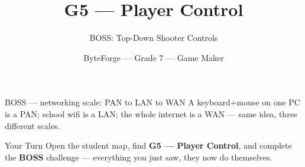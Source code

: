 \documentclass[aspectratio=169]{beamer}
\title{G5 — Player Control}
\subtitle{BOSS: Top-Down Shooter Controls}
\author{ByteForge --- Grade 7 --- Game Maker}
\date{}
\begin{document}
\begin{frame}
    \titlepage
\end{frame}

\begin{frame}{BOSS — networking scale: PAN to LAN to WAN}
    \Large
    A keyboard+mouse on one PC is a PAN; school wifi is a LAN; the whole internet is a WAN — same idea, three different scales.
\end{frame}

\begin{frame}{Your Turn}
    \Large
    Open the student map, find \textbf{G5 — Player Control}, and complete
    the \textbf{BOSS} challenge --- everything you just saw, they now do themselves.
\end{frame}
\end{document}
